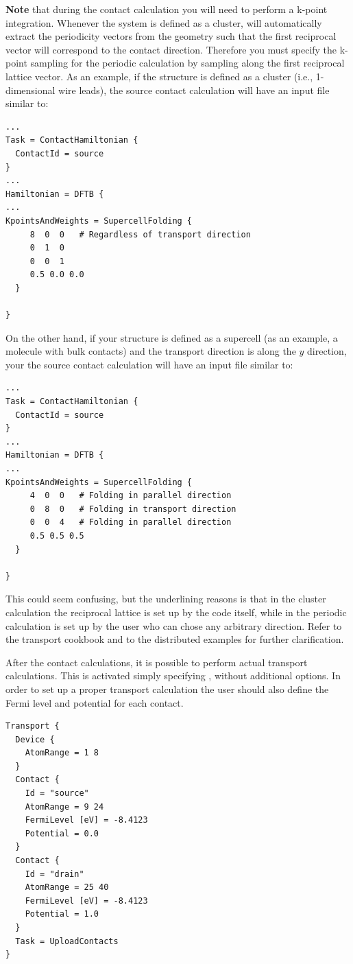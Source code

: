 {\bf Note} that during the contact calculation you will need to perform a
k-point integration.  Whenever the system is defined as a cluster, \dftbp{} will
automatically extract the periodicity vectors from the geometry such that the
first reciprocal vector will correspond to the contact direction.  Therefore you
must specify the k-point sampling for the periodic calculation by sampling along
the first reciprocal lattice vector.  As an example, if the structure is defined
as a cluster (i.e., 1-dimensional wire leads), the source contact calculation
will have an input file similar to:

\begin{verbatim}
...
Task = ContactHamiltonian {
  ContactId = source
}
...
Hamiltonian = DFTB {
...
KpointsAndWeights = SupercellFolding {
     8  0  0   # Regardless of transport direction
     0  1  0
     0  0  1
     0.5 0.0 0.0
  }

}
\end{verbatim}

On the other hand, if your structure is defined as a supercell (as an example, a
molecule with bulk contacts) and the transport direction is along the $y$
direction, your the source contact calculation will have an input file similar
to:

\begin{verbatim}
...
Task = ContactHamiltonian {
  ContactId = source
}
...
Hamiltonian = DFTB {
...
KpointsAndWeights = SupercellFolding {
     4  0  0   # Folding in parallel direction
     0  8  0   # Folding in transport direction
     0  0  4   # Folding in parallel direction
     0.5 0.5 0.5
  }

}
\end{verbatim}


This could seem confusing, but the underlining reasons is that in the cluster
calculation the reciprocal lattice is set up by the code itself, while in the
periodic calculation is set up by the user who can chose any arbitrary
direction.  Refer to the transport cookbook and to the distributed examples for
further clarification.

 After the contact calculations, it is
possible to perform actual transport calculations. This is activated simply
specifying , without additional options. In order to
set up a proper transport calculation the user should also define the Fermi level
and potential for each contact.
\begin{verbatim}
Transport {
  Device {
    AtomRange = 1 8
  }
  Contact {
    Id = "source"
    AtomRange = 9 24
    FermiLevel [eV] = -8.4123
    Potential = 0.0
  }
  Contact {
    Id = "drain"
    AtomRange = 25 40
    FermiLevel [eV] = -8.4123
    Potential = 1.0
  }
  Task = UploadContacts
}
\end{verbatim}

